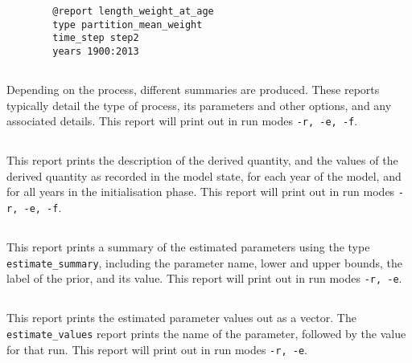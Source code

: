 \begin{verbatim}
		@report length_weight_at_age
		type partition_mean_weight
		time_step step2
		years 1900:2013
\end{verbatim}

\subsection{}

Depending on the process, different summaries are produced. These reports typically detail the type of process, its parameters and other options, and any associated details. This report will print out in run modes \texttt{-r, -e, -f}.

\subsection{}

This report prints the description of the derived quantity, and the values of the derived quantity as recorded in the model state, for each year of the model, and for all years in the initialisation phase. This report will print out in run modes \texttt{-r, -e, -f}.

\subsection{}

This report prints a summary of the estimated parameters using the type \texttt{estimate\_summary}, including the parameter name, lower and upper bounds, the label of the prior, and its value. This report will print out in run modes \texttt{-r, -e}.

\subsection{}

This report prints the estimated parameter values out as a vector. The \texttt{estimate\_values} report prints the name of the parameter, followed by the value for that run. This report will print out in run modes \texttt{-r, -e}.

\subsection{}

